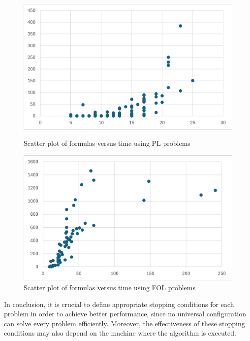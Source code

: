 \begin{figure}[h]
    \centering
    \begin{minipage}{0.48\textwidth}
        \centering
        \includegraphics[width=\linewidth]{Chapters/Figures/time_formulas_pl.png}
        \caption{Scatter plot of formulas versus time using PL problems}
        \label{fig:formulas-time-pl}
    \end{minipage}
    \hfill
    \begin{minipage}{0.48\textwidth}
        \centering
        \includegraphics[width=\linewidth]{Chapters/Figures/time_formulas_fol.png}
        \caption{Scatter plot of formulas versus time using FOL problems}
        \label{fig:formulas-time-fol}
    \end{minipage}
\end{figure}

In conclusion, it is crucial to define appropriate stopping conditions for each problem in order to achieve better performance, since no universal configuration can solve every problem efficiently. Moreover, the effectiveness of these stopping conditions may also depend on the machine where the algorithm is executed.

